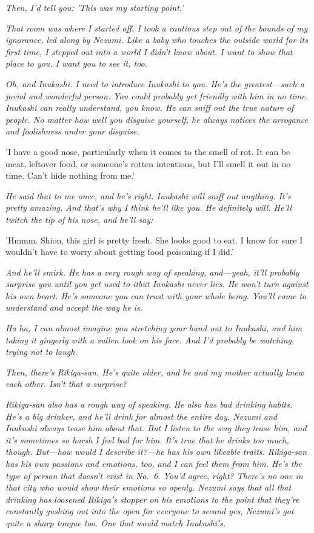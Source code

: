 \emph{Then, I'd tell you: 'This was my starting point.'}

\emph{That room was where I started off. I took a cautious step out of the
bounds of my ignorance, led along by Nezumi. Like a baby who touches the
outside world for its first time, I stepped out into a world I didn't
know about. I want to show that place to you. I want you to see it, too.}

\emph{Oh, and Inukashi. I need to introduce Inukashi to you. He's the
greatest---such a jovial and wonderful person. You could probably get
friendly with him in no time. Inukashi can really understand, you know.
He can sniff out the true nature of people. No matter how well you
disguise yourself, he always notices the arrogance and foolishness under
your disguise.}

'I have a good nose, particularly when it comes to the smell of rot. It
can be meat, leftover food, or someone's rotten intentions, but I'll
smell it out in no time. Can't hide nothing from me.'

\emph{He said that to me once, and he's right. Inukashi will sniff out
anything. It's pretty amazing. And that's why I think he'll like you. He
definitely will. He'll twitch the tip of his nose, and he'll say:}

'Hmmm. Shion, this girl is pretty fresh. She looks good to eat. I know
for sure I wouldn't have to worry about getting food poisoning if I
did.'

\emph{And he'll smirk. He has a very rough way of speaking, and---yeah, it'll
probably surprise you until you get used to it\el but Inukashi never
lies. He won't turn against his own heart. He's someone you can trust
with your whole being. You'll come to understand and accept the way he
is.}

\emph{Ha ha, I can almost imagine you stretching your hand out to Inukashi,
and him taking it gingerly with a sullen look on his face. And I'd
probably be watching, trying not to laugh.}

\emph{Then, there's Rikiga-san. He's quite older, and he and my mother
actually knew each other. Isn't that a surprise?}

\emph{Rikiga-san also has a rough way of speaking. He also has bad drinking
habits. He's a big drinker, and he'll drink for almost the entire day.
Nezumi and Inukashi always tease him about that. But I listen to the way
they tease him, and it's sometimes so harsh I feel bad for him. It's
true that he drinks too much, though. But---how would I describe it?---he
has his own likeable traits. Rikiga-san has his own passions and
emotions, too, and I can feel them from him. He's the type of person
that doesn't exist in No.~6. You'd agree, right? There's no one in that
city who would show their emotions so openly. Nezumi says that all that
drinking has loosened Rikiga's stopper on his emotions to the point that
they're constantly gushing out into the open for everyone to see\el and
yes, Nezumi's got quite a sharp tongue too. One that would match
Inukashi's.}

